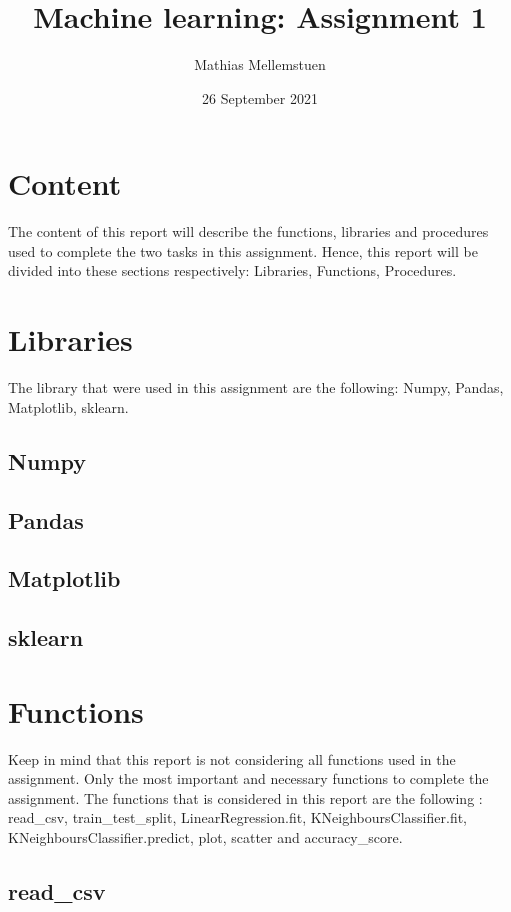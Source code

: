 \documentclass[titlepage, 11pt]{article}
\title{Machine learning: Assignment 1}
\author{Mathias Mellemstuen}
\date{26 September 2021}
\begin{document}
    \maketitle
    
    \section{Content}
    The content of this report will describe the functions, libraries and procedures used to complete the two tasks in this assignment. Hence, this report will be divided into these sections respectively: Libraries, Functions, Procedures.
	\section{Libraries}
	
	The library that were used in this assignment are the following: Numpy, Pandas, Matplotlib, sklearn.

	\subsection{Numpy}
	
	\subsection{Pandas}
	
	\subsection{Matplotlib}
	
	\subsection{sklearn}
	
	
	\section{Functions}
	
	Keep in mind that this report is not considering all functions used in the assignment. Only the most important and necessary functions to complete the assignment. The functions that is considered in this report are the following : read\_csv, train\_test\_split, LinearRegression.fit, KNeighboursClassifier.fit, KNeighboursClassifier.predict, plot, scatter and accuracy\_score.

	\subsection{read\_csv}
	
\end{document}
